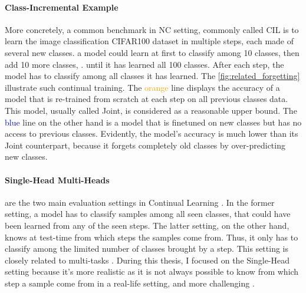 \paragraph{Class-Incremental Example} More concretely, a common benchmark in \ac{NC} setting,
commonly called \ac{CIL} is to learn the image classification CIFAR100 dataset
\citep{krizhevskycifar100} in multiple steps, each made of several new classes. \eg a model could
learn at first to classify among 10 classes, then add 10 more classes, \etc. until it has learned
all 100 classes. After each step, the model has to classify among all classes it has learned. The
\autoref{fig:related_forgetting} illustrate such continual training. The \textcolor{orange}{orange}
line displays the accuracy of a model that is re-trained from scratch at each step on all previous
classes data. This model, usually called Joint, is considered as a reasonable upper bound. The
\textcolor{blue}{blue} line on the other hand is a model that is finetuned on new classes but has no
access to previous classes. Evidently, the model's accuracy is much lower than its Joint
counterpart, because it forgets completely old classes by over-predicting new classes.

\paragraph{Single-Head \vs Multi-Heads} are the two main evaluation settings in Continual Learning
. In the former setting, a model has to classify samples among all seen classes,
that could have been learned from any of the seen steps. The latter setting, on the other hand,
knows at test-time from which steps the samples come from. Thus, it only has to classify among the
limited number of classes brought by a step. This setting is closely related to multi-tasks
. During this thesis, I focused on the Single-Head setting because it's more realistic
as it is not always possible to know from which step a sample come from in a real-life setting, and
more challenging \citep{lesort2019regulshortcomings}.


